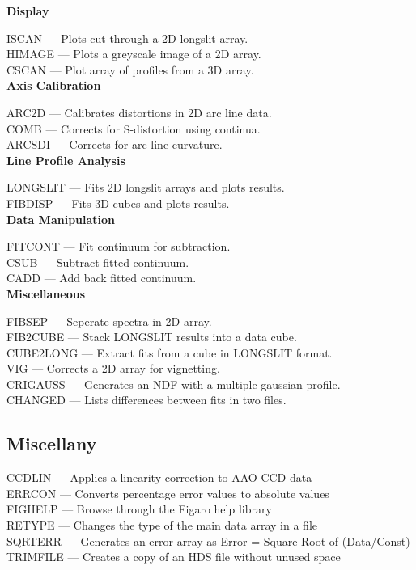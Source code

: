\documentclass[11pt,twoside]{article}
\newcommand{\htmlref}[2]{#1}
\begin{document}
{\bf Display}

\htmlref{ISCAN}{ISCAN} --- Plots cut through a 2D longslit array.\\
\htmlref{HIMAGE}{HIMAGE} --- Plots a greyscale image of a 2D array.\\
\htmlref{CSCAN}{CSCAN} --- Plot array of profiles from a 3D array.\\

{\bf Axis Calibration}

\htmlref{ARC2D}{ARC2D} --- Calibrates distortions in 2D arc line data.\\
\htmlref{COMB}{COMB} --- Corrects for S-distortion using continua.\\
\htmlref{ARCSDI}{ARCSDI} --- Corrects for arc line curvature.\\

{\bf Line Profile Analysis}

\htmlref{LONGSLIT}{LONGSLIT} --- Fits 2D longslit arrays and plots results.\\
\htmlref{FIBDISP}{FIBDISP} --- Fits 3D cubes and plots results.\\

{\bf Data Manipulation}

\htmlref{FITCONT}{FITCONT} --- Fit continuum for subtraction.\\
\htmlref{CSUB}{CSUB} --- Subtract fitted continuum.\\
\htmlref{CADD}{CADD} --- Add back fitted continuum.\\

{\bf Miscellaneous}

\htmlref{FIBSEP}{FIBSEP} --- Seperate spectra in 2D array.\\
\htmlref{FIB2CUBE}{FIB2CUBE} --- Stack LONGSLIT results into a data cube.\\
\htmlref{CUBE2LONG}{CUBE2LONG} --- Extract fits from a cube in LONGSLIT format.\\
\htmlref{VIG}{VIG} --- Corrects a 2D array for vignetting.\\
\htmlref{CRIGAUSS}{CRIGAUSS} --- Generates an NDF with a multiple gaussian profile.\\
\htmlref{CHANGED}{CHANGED} --- Lists differences between fits in two files.

\subsection{\label{classifmisc}Miscellany}

\htmlref{CCDLIN}{CCDLIN} --- Applies a linearity correction to AAO CCD data\\
\htmlref{ERRCON}{ERRCON} --- Converts percentage error values to absolute values\\
\htmlref{FIGHELP}{FIGHELP} --- Browse through the Figaro help library\\
\htmlref{RETYPE}{RETYPE} --- Changes the type of the main data array in a file\\
\htmlref{SQRTERR}{SQRTERR} --- Generates an error array as Error = Square Root of (Data/Const)\\
\htmlref{TRIMFILE}{TRIMFILE} --- Creates a copy of an HDS file without unused space
\end{document}
